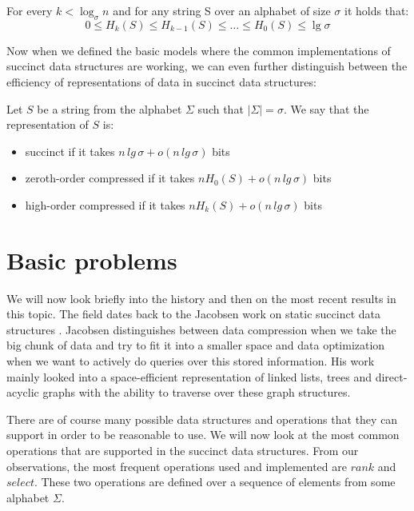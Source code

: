 \begin{theorem}
For every $k<\log_{\sigma}n$ and for any string S over an alphabet of size $\sigma$ it holds that:
$$0\leq H_{k}(S)\leq H_{k-1}(S)\leq \ldots\leq H_0(S) \leq \lg \sigma$$
\end{theorem}

Now when we defined the basic models where the common implementations of succinct data structures are working, we can even further distinguish between the efficiency of representations of data in succinct data structures:

\begin{definition}
Let $S$ be a string from the alphabet $\Sigma$ such that $|\Sigma|=\sigma$. We say that the representation of $S$ is:
\begin{itemize}
    \item succinct if it takes $n\,lg\,\sigma + o(n\,lg\,\sigma)$ bits
    \item zeroth-order compressed if it takes $nH_0(S) + o(n\,lg\,\sigma)$ bits
    \item high-order compressed if it takes $nH_k(S) + o(n\,lg\,\sigma)$ bits
\end{itemize}
\end{definition}

\section{Basic problems}

We will now look briefly into the history and then on the most recent results in this topic. The field dates back to the Jacobsen work on static succinct data structures \cite{jacobson1988succinct}. Jacobsen distinguishes between data compression when we take the big chunk of data and try to fit it into a smaller space and
data optimization when we want to actively do queries over this stored information. His work mainly looked into a space-efficient representation of linked lists, trees and direct-acyclic graphs with the ability to traverse over these graph structures.

There are of course many possible data structures and operations that they can support in order to be reasonable to use. We will now look at the most common operations that are supported in the succinct data structures. From our observations, the most frequent operations used and implemented are $rank$ and $select$. These two operations are defined over a sequence of elements from some alphabet $\Sigma$.

